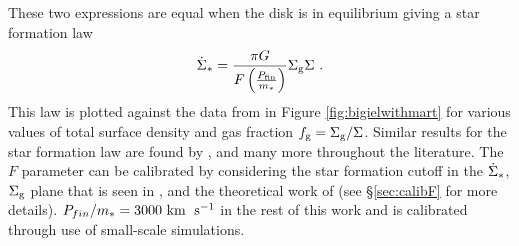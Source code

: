 These two expressions are equal when the disk is in equilibrium giving a star formation law
\begin{equation}
\label{eqn:martsfr}
\dot{\Sigma}_* = \frac{\pi G}{F \left(\frac{P_\mathrm{fin}}{m_*}\right)} \Sigma_\mathrm{g} \Sigma~.
\end{equation}
This law is plotted against the data from \citet{bigiel_star_2008} in Figure \ref{fig:bigielwithmart} for various values of total surface density and gas fraction $f_\mathrm{g} = \Sigma_\mathrm{g}/\Sigma$.
Similar results for the star formation law are found by \citet{ostriker_maximally_2011, faucher-giguere_feedback-regulated_2013, martizzi_supernova_2016}, and many more throughout the literature.
The $F$ parameter can be calibrated by considering the star formation cutoff in the $\dot{\Sigma}_*$, $\Sigma_\mathrm{g}$ plane that is seen in \citet{bigiel_star_2008}, and the theoretical work of \citet{schaye_star_2004} (see \S \ref{sec:calibF} for more details).
$P_{fin}/m_* = 3000 ~\mathrm{km}\;~\mathrm{s}^{-1}$ in the rest of this work and is calibrated through use of small-scale simulations.
